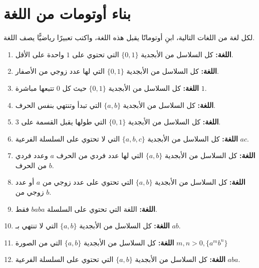 ﻿\documentclass[12pt]{article}
\begin{document}
\begin{enumerate}[itemsep=3em]
\begin{enumerate}[itemsep=3em]
\begin{enumerate}
\end{enumerate}


\clearpage
\section{بناء أوتومات من اللغة}

لكل لغة من اللغات التالية، ابنِ أوتوماتًا يقبل هذه اللغة، واكتب تعبيرًا رياضيًّا يصف اللغة.

\begin{enumerate}

\item
\textbf{اللغة:} كل السلاسل من الأبجدية $\{0, 1\}$ التي تحتوي على $1$ واحدة على الأقل.

\item
\textbf{اللغة:} كل السلاسل من الأبجدية $\{0, 1\}$ التي لها عدد زوجي من الأصفار.

\item
\textbf{اللغة:} كل السلاسل من الأبجدية $\{0, 1\}$ حيث كل $0$ تتبعها مباشرة $1$.

\item
\textbf{اللغة:} كل السلاسل من الأبجدية $\{a, b\}$ التي تبدأ وتنتهي بنفس الحرف.

\item
\textbf{اللغة:} كل السلاسل من الأبجدية $\{0, 1\}$ التي طولها يقبل القسمة على 3.

\item
\textbf{اللغة:} كل السلاسل من الأبجدية $\{a, b, c\}$ التي لا تحتوي على السلسلة الفرعية $ac$.

\item
\textbf{اللغة:} كل السلاسل من الأبجدية $\{a, b\}$ التي لها عدد فردي من الحرف $a$ وعدد فردي من الحرف $b$.

\item
\textbf{اللغة:} كل السلاسل من الأبجدية $\{a, b\}$ التي تحتوي على عدد زوجي من $a$ أو عدد زوجي من $b$.

\item
\textbf{اللغة:} اللغة التي تحتوي على السلسلة $baba$ فقط.

\item
\textbf{اللغة:} كل السلاسل من الأبجدية $\{a, b\}$ التي لا تنتهي بـ $ab$.

\item
\textbf{اللغة:} كل السلاسل من الأبجدية $\{a, b\}$ التي من الصورة $m,n>0, \{a^mb^n\}$

\item
\textbf{اللغة:} كل السلاسل من الأبجدية $\{a, b\}$ التي تحتوي على السلسلة الفرعية $aba$.


\end{enumerate}
\end{enumerate}
\end{enumerate}
\end{document}
